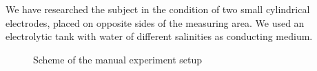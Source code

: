 \documentclass{article}
\begin{document}
We have researched the subject in the condition of two small cylindrical electrodes, placed on opposite sides of the measuring area. We used an electrolytic tank with water of different salinities as conducting medium.



\begin{figure}[h]
	\begin{center}
		\begin{minipage}[h]{0.47\linewidth}
			\caption{Scheme of the manual experiment setup}
			\label{fig:mesh1}
		\end{minipage}
		\hfill
		\begin{minipage}[h]{0.47\linewidth}

\end{minipage}
\end{center}
\end{figure}
\end{document}
